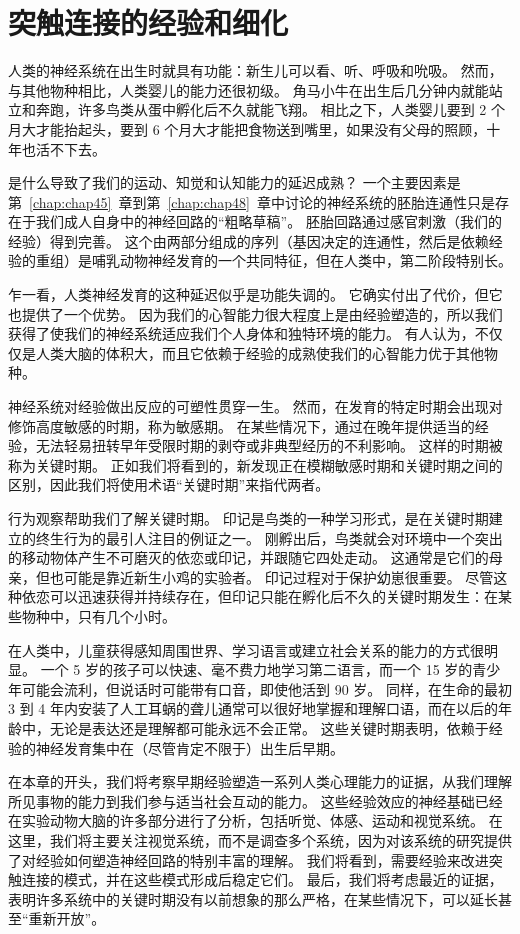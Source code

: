 \chapter{突触连接的经验和细化} \label{chap:chap49}


人类的神经系统在出生时就具有功能：新生儿可以看、听、呼吸和吮吸。
然而，与其他物种相比，人类婴儿的能力还很初级。
角马小牛在出生后几分钟内就能站立和奔跑，许多鸟类从蛋中孵化后不久就能飞翔。
相比之下，人类婴儿要到 2 个月大才能抬起头，要到 6 个月大才能把食物送到嘴里，如果没有父母的照顾，十年也活不下去。


是什么导致了我们的运动、知觉和认知能力的延迟成熟？
一个主要因素是第~\ref{chap:chap45}~章到第~\ref{chap:chap48}~章中讨论的神经系统的胚胎连通性只是存在于我们成人自身中的神经回路的“粗略草稿”。
胚胎回路通过感官刺激（我们的经验）得到完善。
这个由两部分组成的序列（基因决定的连通性，然后是依赖经验的重组）是哺乳动物神经发育的一个共同特征，但在人类中，第二阶段特别长。


乍一看，人类神经发育的这种延迟似乎是功能失调的。
它确实付出了代价，但它也提供了一个优势。
因为我们的心智能力很大程度上是由经验塑造的，所以我们获得了使我们的神经系统适应我们个人身体和独特环境的能力。
有人认为，不仅仅是人类大脑的体积大，而且它依赖于经验的成熟使我们的心智能力优于其他物种。


神经系统对经验做出反应的可塑性贯穿一生。
然而，在发育的特定时期会出现对修饰高度敏感的时期，称为敏感期。
在某些情况下，通过在晚年提供适当的经验，无法轻易扭转早年受限时期的剥夺或非典型经历的不利影响。
这样的时期被称为关键时期。
正如我们将看到的，新发现正在模糊敏感时期和关键时期之间的区别，因此我们将使用术语“关键时期”来指代两者。


行为观察帮助我们了解关键时期。
印记是鸟类的一种学习形式，是在关键时期建立的终生行为的最引人注目的例证之一。
刚孵出后，鸟类就会对环境中一个突出的移动物体产生不可磨灭的依恋或印记，并跟随它四处走动。
这通常是它们的母亲，但也可能是靠近新生小鸡的实验者。 印记过程对于保护幼崽很重要。
尽管这种依恋可以迅速获得并持续存在，但印记只能在孵化后不久的关键时期发生：在某些物种中，只有几个小时。


在人类中，儿童获得感知周围世界、学习语言或建立社会关系的能力的方式很明显。
一个 5 岁的孩子可以快速、毫不费力地学习第二语言，而一个 15 岁的青少年可能会流利，但说话时可能带有口音，即使他活到 90 岁。
同样，在生命的最初 3 到 4 年内安装了人工耳蜗的聋儿通常可以很好地掌握和理解口语，而在以后的年龄中，无论是表达还是理解都可能永远不会正常。
这些关键时期表明，依赖于经验的神经发育集中在（尽管肯定不限于）出生后早期。


在本章的开头，我们将考察早期经验塑造一系列人类心理能力的证据，从我们理解所见事物的能力到我们参与适当社会互动的能力。
这些经验效应的神经基础已经在实验动物大脑的许多部分进行了分析，包括听觉、体感、运动和视觉系统。
在这里，我们将主要关注视觉系统，而不是调查多个系统，因为对该系统的研究提供了对经验如何塑造神经回路的特别丰富的理解。
我们将看到，需要经验来改进突触连接的模式，并在这些模式形成后稳定它们。
最后，我们将考虑最近的证据，表明许多系统中的关键时期没有以前想象的那么严格，在某些情况下，可以延长甚至“重新开放”。


